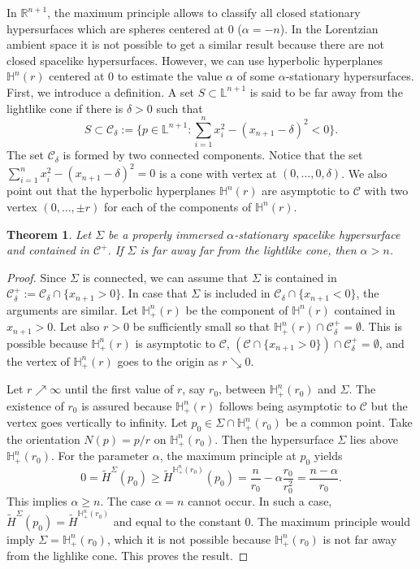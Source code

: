 \documentclass[a4paper,12pt]{amsart}
\newtheorem{theorem}{Theorem}[section]
\theoremstyle{definition}
\def\r{\mathbb R}
\def\h{\mathbb H}
\def\l{\mathbb L}
\begin{document}
    In $\r^{n+1}$, the maximum principle allows to classify all  closed stationary hypersurfaces which are   spheres centered at $0$ ($\alpha=-n$). In the Lorentzian ambient space it is not possible to get a similar result because there are not closed spacelike hypersurfaces. However, we can use hyperbolic hyperplanes $\h^n(r)$ centered at $0$ to estimate the value $\alpha$ of some $\alpha$-stationary hypersurfaces. First, we introduce a definition. A set $S\subset\l^{n+1}$ is said to be  far away from the lightlike cone if there is $\delta>0$ such that 
  $$S\subset \mathcal{C}_\delta:=\{p\in\l^{n+1}\colon \sum_{i=1}^nx_i^2-(x_{n+1}-\delta)^2<0\}.$$
The set $\mathcal{C}_\delta$ is formed by two connected components.  Notice that the set $\sum_{i=1}^nx_i^2-(x_{n+1}-\delta)^2=0$ is a cone with vertex at $(0,\ldots,0,\delta)$. We also point out that the hyperbolic hyperplanes $\h^n(r)$ are asymptotic to $\mathcal{C}$ with two vertex $(0,\ldots,\pm r)$ for each of the components of $\h^n(r)$.      
  
  \begin{theorem} Let $\Sigma$ be a properly immersed $\alpha$-stationary spacelike hypersurface and  contained in $\mathcal{C}^+$. If $\Sigma$ is far away far from the lightlike cone, then $\alpha>n$.
  \end{theorem}
  \begin{proof}
  Since $\Sigma$ is connected, we can assume that $\Sigma$ is contained in $\mathcal{C}_\delta^+:=\mathcal{C}_\delta\cap\{x_{n+1}>0\}$.   In case that $\Sigma$ is included in  $\mathcal{C}_\delta\cap\{x_{n+1}<0\}$, the arguments are similar.   Let $\h^n_+(r)$ be the component of $\h^n(r)$ contained in $x_{n+1}>0$. Let also $r>0$ be sufficiently small so that $\h^n_+(r)\cap \mathcal{C}_\delta^+=\emptyset$. This is possible because $\h^n_+(r)$ is asymptotic to $\mathcal{C}$, $(\mathcal{C}\cap \{x_{n+1}>0\})\cap \mathcal{C}_\delta^+=\emptyset$, and the vertex of $\h^n_+(r)$ goes to the origin as $r\searrow 0$. 
  
  
  Let $r\nearrow\infty$ until the first value of $r$, say $r_0$,  between $\h^n_+(r_0)$ and $\Sigma$.  The existence of $r_0$ is assured because $\h^n_+(r)$ follows being asymptotic to $\mathcal{C}$ but the vertex goes vertically to infinity. Let  $p_0\in \Sigma\cap \h^n_+(r_0)$ be a common point. Take the orientation $N(p)=p/r$ on $\h^n_+(r_0)$. Then the hypersurface $\Sigma$ lies above $\h^n_+(r_0)$. For the parameter $\alpha$,  the maximum principle at   $p_0$ yields 
  $$0=\widetilde{H}^\Sigma(p_0)\geq \widetilde{H}^{\h^n_+(r_0)}(p_0)=\frac{n}{r_0}-\alpha\frac{r_0}{r_0^2}=\frac{n-\alpha}{r_0}.$$
  This implies $\alpha\geq n$. The case $\alpha=n$ cannot occur. In such a case, $\widetilde{H}^\Sigma(p_0)=\widetilde{H}^{\h^n_+(r_0)}$ and equal to the constant $0$. The maximum principle would imply $\Sigma=\h^n_+(r_0)$, which it is not possible  because $\h^n_+(r_0)$ is not far away from the lighlike cone. This proves the result.
  \end{proof}
  
\end{document}

